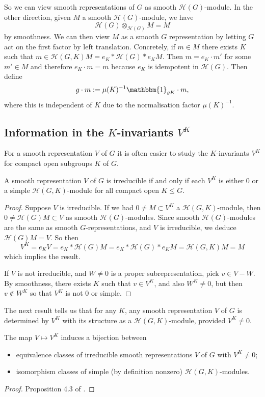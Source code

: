 So we can view smooth representations of $G$ as smooth $\mathcal H(G)$-module. In the other direction, given $M$ a smooth $\mathcal H(G)$-module, we have $$\mathcal H(G) \otimes_{\mathcal H(G)} M = M$$ by smoothness. We can then view $M$ as a smooth $G$ representation by letting $G$ act on the first factor by left translation. Concretely, if $m \in M$ there exists $K$ such that $m \in \mathcal H(G,K)M = e_K*\mathcal H(G)*e_K M$. Then $m = e_K \cdot m'$ for some $m' \in M$ and therefore $e_K \cdot m = m$ because $e_K$ is idempotent in $\mathcal H(G)$. Then define $$g \cdot m := \mu(K)^{-1} \mathbbm{1}_{gK} \cdot m,$$ where this is independent of $K$ due to the normalisation factor $\mu(K)^{-1}$.

\subsection{Information in the $K$-invariants $V^K$}
For a smooth representation $V$ of $G$ it is often easier to study the $K$-invariants $V^K$ for compact open subgroups $K$ of $G$.



\begin{lemma}\label{K inv}
    A smooth representation $V$ of $G$ is irreducible if and only if each $V^K$ is either 0 or a simple $\mathcal H(G,K)$-module for all compact open $K \leq G$.
\end{lemma}
\begin{proof}
    Suppose $V$ is irreducible. If we had $0 \neq M \subset V^K$ a $\mathcal H(G,K)$-module, then $0 \neq \mathcal H(G) M \subset V$ as smooth $\mathcal H(G)$-modules. Since smooth $\mathcal H(G)$-modules are the same as smooth $G$-representations, and $V$ is irreducible, we deduce $\mathcal H(G)M = V$. So then $$V^K = e_K V = e_K * \mathcal H(G)M = e_K * \mathcal H(G) *e_K M = \mathcal H(G,K)M=M$$ which implies the result.

    If $V$ is not irreducible, and $W \neq 0$ is a proper subrepresentation, pick $v \in V-W$. By smoothness, there exists $K$ such that $v \in V^K$, and also $W^K \neq 0$, but then $v \not\in W^K$ so that $V^K$ is not 0 or simple.
\end{proof}

The next result tells us that for any $K$, any smooth representation $V$ of $G$ is determined by $V^K$ with its structure as a $\mathcal H(G,K)$-module, provided $V^K \neq 0$.

\begin{prop}\label{K bij}
    The map $V \mapsto V^K$ induces a bijection between
    \begin{itemize}
        \item equivalence classes of irreducible smooth representations $V$ of $G$ with $V^K \neq 0$;
        \item isomorphism classes of simple (by definition nonzero) $\mathcal H(G,K)$-modules.
    \end{itemize}
\end{prop}
\begin{proof}
    Proposition 4.3 of \cite{BH1}.
\end{proof}

